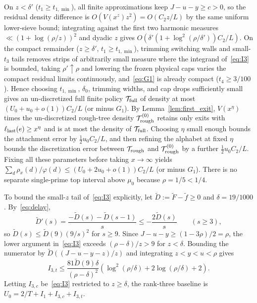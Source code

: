 \documentclass[11pt,reqno]{amsart}
\theoremstyle{remark}
\newcommand{\normF}{\widetilde{F}}
\newcommand{\normf}{\widetilde{f}}
\newcommand{\normD}{\widetilde{D}}
\newcommand{\cT}{\mathcal{T}}
\numberwithin{equation}{section}
\begin{document}
On $z < \delta'$ ($t_1 \ge t_{1,\min}$), all finite approximations keep $J - u - y \ge c > 0$, so the residual density difference is $O(V(x^z) z^2) = O(C_2 z/L)$ by the same uniform lower-sieve bound; integrating against the first two harmonic measures $\ll (1 + \log(\rho/z))^2$ and dyadic $z$ gives $O(\delta'(1 + \log^2(\rho/\delta'))C_2/L)$. On the compact remainder ($z \ge \delta'$, $t_1 \ge t_{1,\min}$), trimming switching walls and small-$t_3$ tails removes strips of arbitrarily small measure where the integrand of~\eqref{eq:I3} is bounded, taking $\rho' \uparrow \rho$ and lowering the frozen physical caps varies the compact residual limits continuously, and~\eqref{eq:G1} is already compact ($t_4 \ge 3/100$). Hence choosing $t_{1,\min}$, $\delta_0$, trimming widths, and cap drops sufficiently small gives an un-discretized full finite policy $\cT_{\rm full}$ of density at most $(U_0 + u_0 + o(1))C_2/L$ (or minus $G_1$). By Lemma~\ref{lem:first_exit}, $V(x^\eta)$ times the un-discretized rough-tree density $\cT_{\rm rough}^{(0)}$ retains only exits with $\ell_{\rm last}(e) \ge x^\eta$ and is at most the density of $\cT_{\rm full}$. Choosing $\eta$ small enough bounds the attachment error by $\tfrac{1}{2}u_0 C_2/L$, and then refining the alphabet at fixed $\eta$ bounds the discretization error between $\cT_{\rm rough}$ and $\cT_{\rm rough}^{(0)}$ by a further $\tfrac{1}{2}u_0 C_2/L$. Fixing all these parameters before taking $x\to\infty$ yields $\sum_d \rho_x(d)/\varphi(d) \le (U_0 + 2u_0 + o(1))C_2/L$ (or minus $G_1$). There is no separate single-prime top interval above $\mu_0$ because $\rho = 1/5 < 1/4$.

To bound the small-$z$ tail of~\eqref{eq:I3} explicitly, let $\normD := \normF - \normf \ge 0$ and $\delta = 19/1000$. By~\eqref{eq:delay},
\begin{equation}\label{eq:delay_D}
\normD'(s) = \frac{-\normD(s) - \normD(s-1)}{s} \le -\frac{2\normD(s)}{s} \qquad (s \ge 3),
\end{equation}
so $\normD(s) \le \normD(9)(9/s)^2$ for $s \ge 9$. Since $J - u - y \ge (1 - 3\rho)/2 = \rho$, the lower argument in~\eqref{eq:I3} exceeds $(\rho - \delta)/z > 9$ for $z < \delta$. Bounding the numerator by $\normD((J-u-y-z)/z)$ and integrating $z < y < u < \rho$ gives
\begin{equation}\label{eq:I3t}
I_{3,t} \le \frac{81\normD(9)\delta}{(\rho-\delta)^2}\left(\log^2(\rho/\delta) + 2\log(\rho/\delta) + 2\right).
\end{equation}
Letting $I_{3,c}$ be~\eqref{eq:I3} restricted to $z \ge \delta$, the rank-three baseline is $U_0 = 2/T + I_1 + I_{3,c} + I_{3,t}$.
\end{document}
